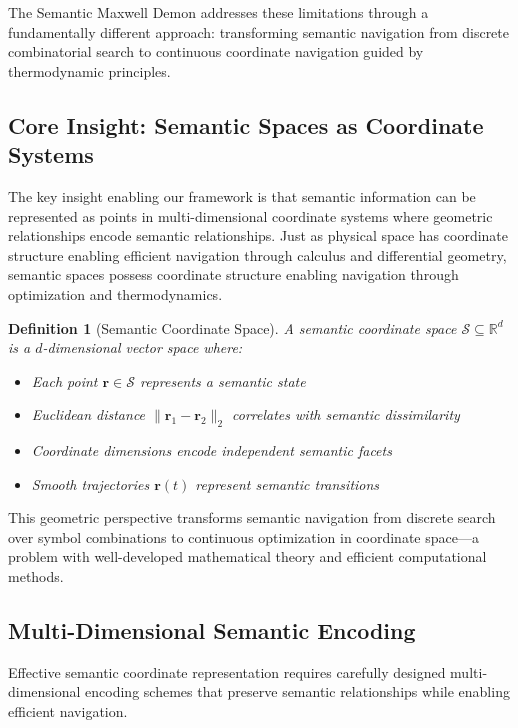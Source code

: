 \documentclass[12pt,a4paper]{article}
\newtheorem{definition}{Definition}
\begin{document}
The Semantic Maxwell Demon addresses these limitations through a fundamentally different approach: transforming semantic navigation from discrete combinatorial search to continuous coordinate navigation guided by thermodynamic principles.

\subsection{Core Insight: Semantic Spaces as Coordinate Systems}

The key insight enabling our framework is that semantic information can be represented as points in multi-dimensional coordinate systems where geometric relationships encode semantic relationships. Just as physical space has coordinate structure enabling efficient navigation through calculus and differential geometry, semantic spaces possess coordinate structure enabling navigation through optimization and thermodynamics.

\begin{definition}[Semantic Coordinate Space]
A semantic coordinate space $\mathcal{S} \subseteq \mathbb{R}^d$ is a $d$-dimensional vector space where:
\begin{itemize}
\item Each point $\mathbf{r} \in \mathcal{S}$ represents a semantic state
\item Euclidean distance $\|\mathbf{r}_1 - \mathbf{r}_2\|_2$ correlates with semantic dissimilarity
\item Coordinate dimensions encode independent semantic facets
\item Smooth trajectories $\mathbf{r}(t)$ represent semantic transitions
\end{itemize}
\end{definition}

This geometric perspective transforms semantic navigation from discrete search over symbol combinations to continuous optimization in coordinate space—a problem with well-developed mathematical theory and efficient computational methods.

\subsection{Multi-Dimensional Semantic Encoding}

Effective semantic coordinate representation requires carefully designed multi-dimensional encoding schemes that preserve semantic relationships while enabling efficient navigation.
\end{document}
